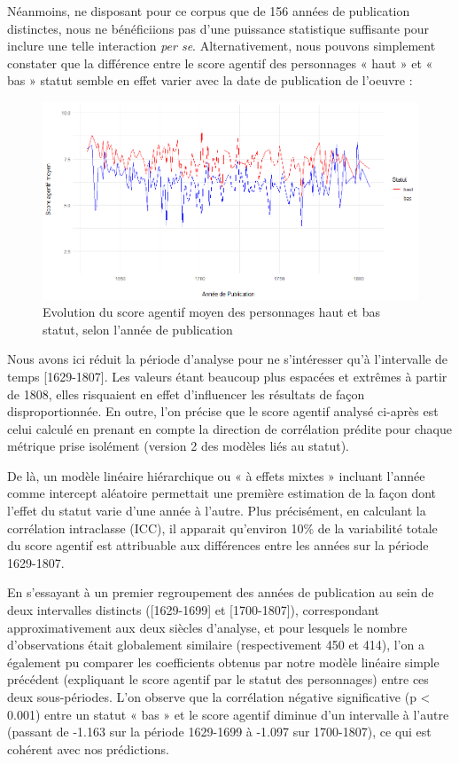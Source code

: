 Néanmoins, ne disposant pour ce corpus que de 156 années de publication distinctes, nous ne bénéficiions pas d’une puissance statistique suffisante pour inclure une telle interaction \textit{per se}. Alternativement, nous pouvons simplement constater que la différence entre le score agentif des personnages « haut » et « bas » statut semble en effet varier avec la date de publication de l'oeuvre : 

\begin{figure}[!ht]
    \centering
    \includegraphics[width=16cm]{img/score_statut_par_annee_publication.png}
    \caption{Evolution du score agentif moyen des personnages haut et bas statut, selon l'année de publication}
    \label{score_statut_par_annee_publication}
\end{figure}

Nous avons ici réduit la période d’analyse pour ne s’intéresser qu’à l’intervalle de temps [1629-1807]. Les valeurs étant beaucoup plus espacées et extrêmes à partir de 1808, elles risquaient en effet d’influencer les résultats de façon disproportionnée. En outre, l'on précise que le score agentif analysé ci-après est celui calculé en prenant en compte la direction de corrélation prédite pour chaque métrique prise isolément (version 2 des modèles liés au statut).

De là, un modèle linéaire hiérarchique ou « à effets mixtes » incluant l'année comme intercept aléatoire permettait une première estimation de la façon dont l'effet du statut varie d'une année à l'autre. Plus précisément, en calculant la corrélation intraclasse (ICC), il apparait qu'environ 10\% de la variabilité totale du score agentif est attribuable aux différences entre les années sur la période 1629-1807.

En s’essayant à un premier regroupement des années de publication au sein de deux intervalles distincts ([1629-1699] et [1700-1807]), correspondant approximativement aux deux siècles d’analyse, et pour lesquels le nombre d’observations était globalement similaire (respectivement 450 et 414), l’on a également pu comparer les coefficients obtenus par notre modèle linéaire simple précédent (expliquant le score agentif par le statut des personnages) entre ces deux sous-périodes. L’on observe que la corrélation négative significative (p < 0.001) entre un statut « bas » et le score agentif diminue d’un intervalle à l’autre (passant de -1.163 sur la période 1629-1699 à -1.097 sur 1700-1807), ce qui est cohérent avec nos prédictions.

